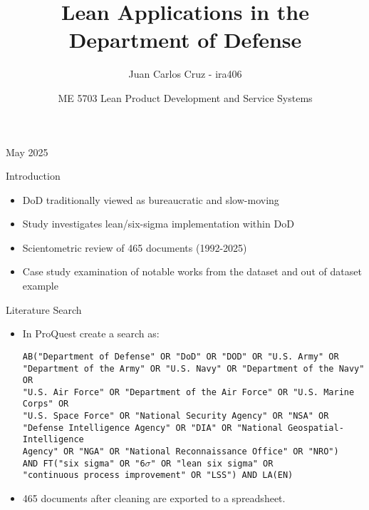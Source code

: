 \documentclass[aspectratio=169,11pt,xcolor={dvipsnames},hyperref={pdftex,pdfpagemode=UseNone,hidelinks,pdfdisplaydoctitle=true},usepdftitle=false]{beamer}
\title{Lean Applications in the Department of Defense}
\author{Juan Carlos Cruz - ira406}
\date{ME 5703 Lean Product Development and Service Systems}
\begin{document}
    
    \begin{frame}
      \titlepage
      May 2025
    \end{frame}
    
    \begin{frame}{Introduction}
      \begin{itemize}
        \item DoD traditionally viewed as bureaucratic and slow-moving
        \item Study investigates lean/six-sigma implementation within DoD
        \item Scientometric review of 465 documents (1992-2025)
        \item Case study examination of notable works from the dataset and out of dataset example
      \end{itemize}
    \end{frame}


    \begin{frame}{Literature Search}
      \begin{itemize}
        \item In ProQuest create a search as:\\
          \begin{minipage}{\linewidth}
          \begin{spacing}{0.8}
          \noindent\texttt{AB("Department of Defense" OR "DoD" OR "DOD" OR "U.S. Army" OR} \\
          \texttt{"Department of the Army" OR "U.S. Navy" OR "Department of the Navy" OR} \\
          \texttt{"U.S. Air Force" OR "Department of the Air Force" OR "U.S. Marine Corps" OR} \\
          \texttt{"U.S. Space Force" OR "National Security Agency" OR "NSA" OR} \\
          \texttt{"Defense Intelligence Agency" OR "DIA" OR "National Geospatial-Intelligence} \\
          \texttt{Agency" OR "NGA" OR "National Reconnaissance Office" OR "NRO")} \\
          \texttt{AND FT("six sigma" OR "6$\sigma$" OR "lean six sigma" OR} \\
          \texttt{"continuous process improvement" OR "LSS") AND LA(EN)}
          \end{spacing}
          \end{minipage}
        \item 465 documents after cleaning are exported to a spreadsheet.
      \end{itemize}
    \end{frame}
\end{document}
